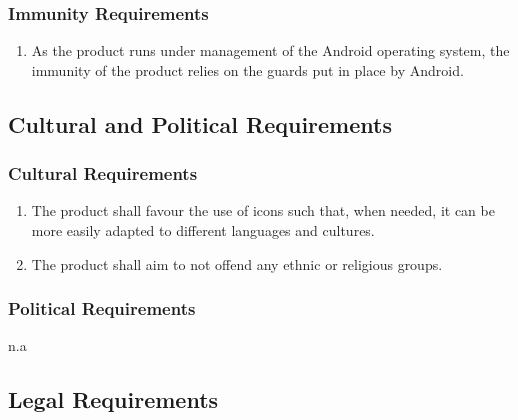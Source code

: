 \documentclass[]{article}
\begin{document}
\subsubsection{Immunity Requirements}
\label{ssub:immunity_requirements}

\begin{enumerate}[{SR}1. ]
	\resumeEnum
	\item As the product runs under management of the Android operating system, the immunity of the product relies on the guards put in place by Android.
\end{enumerate}


\subsection{Cultural and Political Requirements}
\label{sub:cultural_and_political_requirements}

\subsubsection{Cultural Requirements}
\label{ssub:cultural_requirements}
\begin{enumerate}[{CP}1. ]
	\item The product shall favour the use of icons such that, when needed, it can be more easily adapted to different languages and cultures.
	\item The product shall aim to not offend any ethnic or religious groups.
	\holdEnum
\end{enumerate}

\subsubsection{Political Requirements}
\label{ssub:political_requirements}
n.a


\subsection{Legal Requirements}
\label{sub:legal_requirements}
\end{document}
